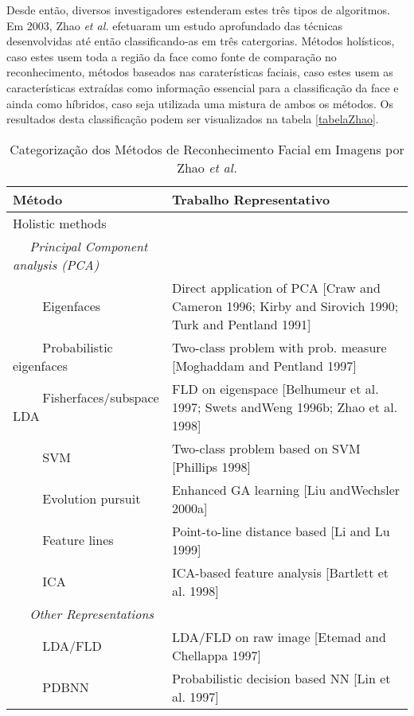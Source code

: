 Desde então, diversos investigadores estenderam estes três tipos de algoritmos. Em 2003, Zhao \textit{et al.} \citep{Zhao2003} efetuaram um estudo aprofundado das técnicas desenvolvidas até então classificando-as em três catergorias. Métodos holísticos, caso estes usem toda a região da face como fonte de comparação no reconhecimento, métodos baseados nas caraterísticas faciais, caso estes usem as características extraídas como informação essencial para a classificação da face e ainda como híbridos, caso seja utilizada uma mistura de ambos os métodos. Os resultados desta classificação podem ser visualizados na tabela \ref{tabelaZhao}.

\begin{center}
\begin{table}
	\caption{Categorização dos Métodos de Reconhecimento Facial em Imagens por Zhao \textit{et al.} \citep{Zhao2003}}
	\centering
	\begin{tabular}{l p{8cm}}
	\hline\hline
        Método                     & Trabalho Representativo\\
	\hline
Holistic methods	 \\	
$\quad$ \textit{Principal Component analysis (PCA)} \\
$\qquad$  Eigenfaces                 & Direct application of PCA [Craw and Cameron 1996; Kirby and Sirovich 1990; Turk and Pentland 1991] \\
$\qquad$        Probabilistic eigenfaces   & Two-class problem with prob. measure [Moghaddam and Pentland 1997] \\
$\qquad$        Fisherfaces/subspace LDA   & FLD on eigenspace [Belhumeur et al. 1997; Swets andWeng 1996b; Zhao et al. 1998] \\ 
$\qquad$        SVM                        & Two-class problem based on SVM [Phillips 1998] \\ 
$\qquad$        Evolution pursuit          & Enhanced GA learning [Liu andWechsler 2000a] \\ 
$\qquad$        Feature lines              & Point-to-line distance based [Li and Lu 1999] \\ 
$\qquad$        ICA                        & ICA-based feature analysis [Bartlett et al. 1998] \\ 
$\quad$ \textit{Other Representations} \\
$\qquad$        LDA/FLD                    & LDA/FLD on raw image [Etemad and Chellappa 1997] \\ 
$\qquad$        PDBNN                      & Probabilistic decision based NN [Lin et al. 1997] \\


\end{tabular}
\end{table}
\end{center}
